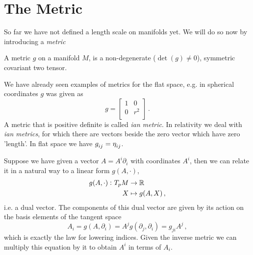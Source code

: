 \section{The Metric}
So far we have not defined a length scale on manifolds yet. We will do so now by
introducing a \emph{metric} 
\begin{definition}[Metric]
A metric $g$ on a manifold $M$, is a non-degenerate ($\det(g)\neq 0$), symmetric
covariant two tensor.
\end{definition}
We have already seen examples of metrics for the flat space, e.g. in spherical coordinates $g$ was given as
\begin{equation}
    g=
    \begin{bmatrix}
        1 & 0\\
        0 & r^2\\
    \end{bmatrix}\,.
\end{equation}
A metric that is positive definite is called \emph{ian metric}. In
relativity we deal with \emph{ian metrics}, for which there are
vectors beside the zero vector which have zero 'length'. In flat space we have
$\tensor{g}{_i_j}=\tensor{\eta}{_i_j}$.
\begin{remark} Suppose we have given a vector $A=A^i\partial_i$
with coordinates $A^i$, then we can relate it 
in a natural way to a linear form $g(A,\cdot)$,
\begin{equation}
\begin{split}
 g(A,\cdot)\,\colon T_pM &\to \mathbb{R}\\
 X &\mapsto g(A,X)\, ,
\end{split}
\end{equation}
i.e. a dual vector. The components of this dual vector are given by its action
on the basis elements of the tangent space
\begin{equation}
A_i=g(A,\partial_i)=A^jg(\partial_j,\partial_i)=g_{ji}A^j\,,
\end{equation}
which is exactly the law for lowering indices. Given the inverse metric we can
multiply this equation by it to obtain $A^i$ in terms of $A_i$.
\end{remark}
